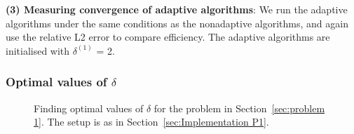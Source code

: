 \documentclass[final]{siamltex}
\begin{document}
{\bf (3) Measuring convergence of adaptive algorithms}: We run the
adaptive algorithms under the same conditions as the nonadaptive
algorithms, and again use the relative L2 error to compare
efficiency. The adaptive algorithms are initialised with $\delta^{(1)}$ = 2.


\subsubsection{Optimal values of $\delta$}\label{sec:Optimal values P1}

\begin{figure}[htb]
\centering
{}
\caption{Finding optimal values of $\delta$ for the problem in Section~\ref{sec:problem 1}. The setup is as in Section~\ref{sec:Implementation P1}.}
\label{fig:P1 opt delta}
\end{figure}
\end{document}
